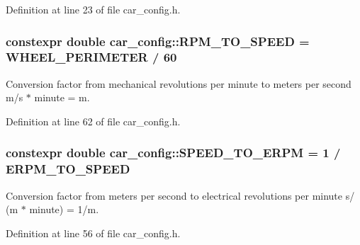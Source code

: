 Definition at line 23 of file car\+\_\+config.\+h.

\subsubsection[{\texorpdfstring{R\+P\+M\+\_\+\+T\+O\+\_\+\+S\+P\+E\+ED}{RPM_TO_SPEED}}]{\setlength{\rightskip}{0pt plus 5cm}constexpr double car\+\_\+config\+::\+R\+P\+M\+\_\+\+T\+O\+\_\+\+S\+P\+E\+ED = {\bf W\+H\+E\+E\+L\+\_\+\+P\+E\+R\+I\+M\+E\+T\+ER} / 60}\hypertarget{namespacecar__config_aee034b6adfd7932f245bc94d869f2bb6}{}\label{namespacecar__config_aee034b6adfd7932f245bc94d869f2bb6}


Conversion factor from mechanical revolutions per minute to meters per second  m/s $\ast$ minute = m. 



Definition at line 62 of file car\+\_\+config.\+h.

\subsubsection[{\texorpdfstring{S\+P\+E\+E\+D\+\_\+\+T\+O\+\_\+\+E\+R\+PM}{SPEED_TO_ERPM}}]{\setlength{\rightskip}{0pt plus 5cm}constexpr double car\+\_\+config\+::\+S\+P\+E\+E\+D\+\_\+\+T\+O\+\_\+\+E\+R\+PM = 1 / {\bf E\+R\+P\+M\+\_\+\+T\+O\+\_\+\+S\+P\+E\+ED}}\hypertarget{namespacecar__config_a0f37aa7e52366aebb006c6e1d3317900}{}\label{namespacecar__config_a0f37aa7e52366aebb006c6e1d3317900}


Conversion factor from meters per second to electrical revolutions per minute  s/ (m $\ast$ minute) = 1/m. 



Definition at line 56 of file car\+\_\+config.\+h.

